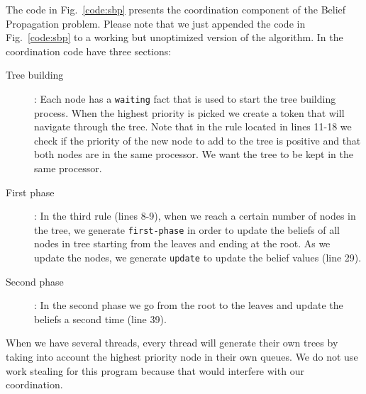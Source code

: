 The code in Fig.~\ref{code:sbp} presents the coordination component of the Belief Propagation problem.
Please note that we just appended the code in Fig.~\ref{code:sbp} to a working but unoptimized version
of the algorithm.
In the coordination code have three sections:
\begin{description}
   \item[Tree building]: Each node has a \texttt{waiting} fact that is used to start the tree building process. When the highest priority is picked we create a token that will navigate through the tree. Note that in the rule located in lines 11-18 we check if the priority of the new node to add to the tree is positive and that both nodes are in the same processor. We want the tree to be kept in the same processor.
   \item[First phase]: In the third rule (lines 8-9), when we reach a certain number of nodes in the tree, we generate \texttt{first-phase} in order to update the beliefs of all nodes in tree starting from the leaves and ending at the root. As we update the nodes, we generate \texttt{update} to update the belief values (line 29).
   \item[Second phase]: In the second phase we go from the root to the leaves and update the beliefs a second time (line 39).
\end{description}

When we have several threads, every thread will generate their own trees by taking into account the highest priority node in their own queues. We do not use work stealing for this program because that would interfere with our coordination.

